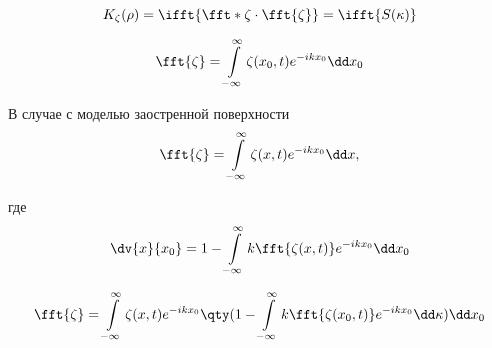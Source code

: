 \begin{equation}
    K_{\zeta}(\rho) = \ifft{\fft*{\zeta} \cdot \fft{\zeta}} = 
    \ifft{S(\kappa)}
\end{equation}

\begin{equation}
    \fft{\zeta} = \int\limits_{-\infty}^{\infty} \zeta(x_0,t) e^{-i kx_0} \dd x_0 
\end{equation}

В случае с моделью заостренной поверхности
\begin{equation}
    \fft{\zeta} = \int\limits_{-\infty}^{\infty} \zeta(x,t) e^{-i kx_0} \dd x,
\end{equation}


где 
\begin{equation}
    \dv{x}{x_0} = 1 -  \int\limits_{-\infty}^{\infty} k
    \fft{\zeta(x,t)}e^{-ikx_0} \dd x_0
\end{equation}

\begin{gather}
    \fft{\zeta} = 
    \int\limits_{-\infty}^{\infty} \zeta(x,t) e^{-i kx_0}
    \qty( 1 -  \int\limits_{-\infty}^{\infty} k \fft{\zeta(x_0,t)}e^{-ikx_0}\dd
    \kappa)
\dd x_0 \end{gather}















